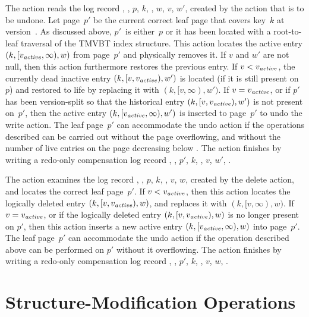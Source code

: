 The  action reads the log record
, , $p$, $k$, \actver, $w$,
$v$, $w'$,  created by the  action that is to be undone. 
Let page~$p'$ be the current correct leaf page that covers key~$k$ at
version~\actver.
As discussed above, $p'$~is either~$p$ or it has been located with a
root-to-leaf traversal of the TMVBT index structure.
This action locates the active entry $(k,[\smash{v_{\text{\textit{active}}}},\infty),w)$ from page~$p'$
and physically removes it.
If $v$ and $w'$ are not null, then this action furthermore restores the
previous entry.
If $v < \smash{v_{\text{\textit{active}}}}$, the currently dead inactive entry $(k,[v,\smash{v_{\text{\textit{active}}}}),w')$ is
located (if it is still present on~$p$) and restored to life by replacing it
with $(k,[v,\infty),w')$. 
If $v = \smash{v_{\text{\textit{active}}}}$, or if $p'$ has been version-split so that the historical
entry $(k,[v,\smash{v_{\text{\textit{active}}}}),w')$ is not present on~$p'$, then the active entry
$(k,[\smash{v_{\text{\textit{active}}}},\infty),w')$ is inserted to page~$p'$ to undo the write
action.
The leaf page~$p'$ can accommodate the undo action if the operations
described can be carried out without the page overflowing, and without the
number of live entries on the page decreasing below \minlive.
The action finishes by writing a redo-only compensation log record
, , $p'$, $k$, \actver, $v$, $w'$, .

The  action examines the log record ,
, $p$, $k$, \actver, $v$, $w$,  created by the delete
action, and locates the correct leaf page~$p'$.
If $v < \smash{v_{\text{\textit{active}}}}$, then this action locates the logically deleted entry 
$(k,[v,\smash{v_{\text{\textit{active}}}}),w)$, and replaces it with $(k,[v,\infty),w)$.
If $v = \smash{v_{\text{\textit{active}}}}$, or if the logically deleted entry $(k,[v,\smash{v_{\text{\textit{active}}}}),w)$ is no
longer present on $p'$, then this action inserts a new active entry
$(k,[\smash{v_{\text{\textit{active}}}},\infty),w)$ into page~$p'$. 
The leaf page~$p'$ can accommodate the undo action if the operation
described above can be performed on $p'$ without it overflowing. 
The action finishes by writing a redo-only compensation log
record , , $p'$, $k$, \actver, $v$, $w$, .


\section{Structure-Modification Operations}
\label{sec:tmvbt:smo}

